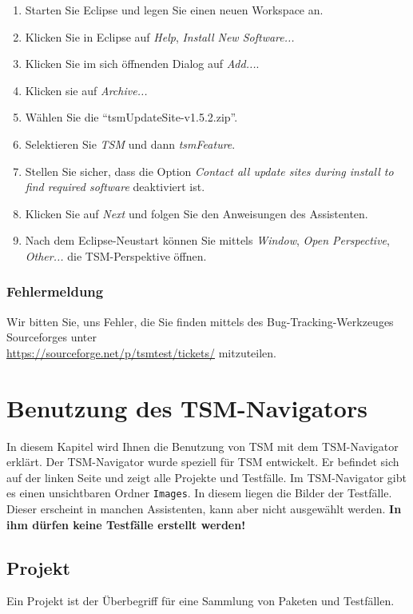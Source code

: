 \documentclass[11pt,a4paper,titlepage]{article}
\begin{document}
\begin{enumerate}
 \item Starten Sie Eclipse und legen Sie einen neuen Workspace an.
 \item Klicken Sie in Eclipse auf \textit{Help}, \textit{Install New Software...}
 \item Klicken Sie im sich öffnenden Dialog auf \textit{Add...}.
 \item Klicken sie auf \textit{Archive...}
 \item Wählen Sie die "`tsmUpdateSite-v1.5.2.zip"'.
 \item Selektieren Sie \textit{TSM} und dann \textit{tsmFeature}.
 \item Stellen Sie sicher, dass die Option \textit{Contact all update sites during install to find required software} deaktiviert ist.
 \item Klicken Sie auf \textit{Next} und folgen Sie den Anweisungen des Assistenten.
 \item Nach dem Eclipse-Neustart können Sie mittels \textit{Window}, \textit{Open Perspective}, \textit{Other...} die TSM-Perspektive öffnen.
\end{enumerate}

\subsubsection{Fehlermeldung}
Wir bitten Sie, uns Fehler, die Sie finden mittels des Bug-Tracking-Werkzeuges Sourceforges unter \\ \href{https://sourceforge.net/p/tsmtest/tickets/}
{https://sourceforge.net/p/tsmtest/tickets/} mitzuteilen.

\section{Benutzung des TSM-Navigators}
In diesem Kapitel wird Ihnen die Benutzung von TSM mit dem TSM-Navigator erklärt. Der TSM-Navigator wurde speziell für TSM entwickelt.
Er befindet sich auf der linken Seite und zeigt alle Projekte und Testfälle. Im TSM-Navigator gibt es einen unsichtbaren Ordner \texttt{Images}. In diesem liegen die Bilder der Testfälle.
Dieser erscheint in manchen Assistenten, kann aber nicht ausgewählt werden. \textbf{In ihm dürfen keine Testfälle erstellt werden!}

\subsection{Projekt}
Ein Projekt ist der Überbegriff für eine Sammlung von Paketen und Testfällen.
\end{document}
